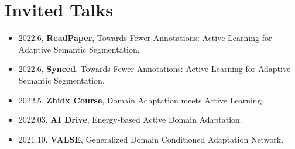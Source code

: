 \documentclass[letterpaper,11pt]{article}
\newcommand{\resumeSubHeadingListStart}{\begin{itemize}[leftmargin=*]}
\newcommand{\resumeSubHeadingListEnd}{\end{itemize}}
\begin{document}
\section{Invited Talks}
\resumeSubHeadingListStart
  \item 2022.6, \textbf{ReadPaper}, Towards Fewer Annotations: Active Learning for Adaptive Semantic Segmentation. \vspace{-2pt} 
  \item 2022.6, \textbf{Synced}, Towards Fewer Annotations: Active Learning for Adaptive Semantic Segmentation. \vspace{-2pt} 
  \item 2022.5, \textbf{Zhidx Course}, Domain Adaptation meets Active Learning. \vspace{-2pt}  
  \item 2022.03, \textbf{AI Drive}, Energy-based Active Domain Adaptation. \vspace{-2pt}
  \item 2021.10, \textbf{VALSE}, Generalized Domain Conditioned Adaptation Network. \vspace{-2pt}
\resumeSubHeadingListEnd


\end{document}

